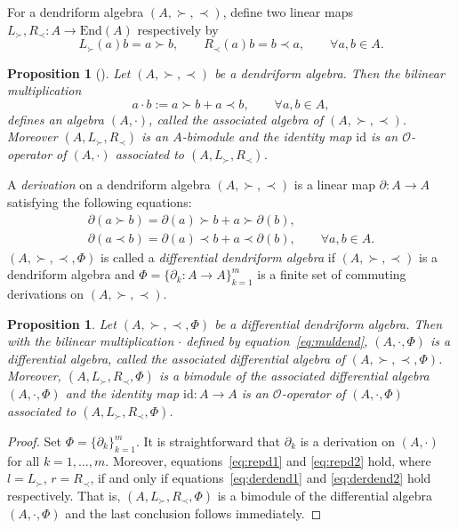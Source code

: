 \documentclass[10pt,a4paper]{amsart}
\numberwithin{equation}{section}
\newtheorem{Proposition}[Theorem]{Proposition}
{ \theoremstyle{definition}
	\newtheorem{Definition}[Theorem]{Definition}
	\newtheorem{Note}[Theorem]{Note}
	\newtheorem{Example}[Theorem]{Example}
	\newtheorem{Remark}[Theorem]{Remark} }
\newcommand{\id}{\mathrm{id}}
\newcommand{\End}{\mathrm{End}}
\begin{document}
For a dendriform algebra $(A, \succ, \prec)$, define two linear
maps $L_\succ, R_\prec\colon A \to \End(A)$ respectively by
\begin{equation*}
	L_\succ (a)b = a \succ b, \qquad R_\prec(a)b = b\prec a,\qquad \forall a, b\in A.
\end{equation*}

\begin{Proposition}[\cite{BaiDouble,Loday2001Dialgebras}]
 Let $(A, \succ, \prec)$ be a dendriform algebra.
 Then the bilinear multiplication
 \begin{equation}
 a \cdot b := a \succ b + a \prec b, \qquad \forall a, b \in A, \label{eq:muldend}
 \end{equation}
 defines an algebra $(A, \cdot)$, called the \textit{associated algebra} of $(A, \succ, \prec)$.
 Moreover $(A, L_\succ, R_\prec)$ is an $A$-bimodule and
 the identity map $\id$ is an $\mathcal{O}$-operator of $(A, \cdot)$ associated to $(A, L_\succ, R_\prec)$.
\end{Proposition}


\begin{Definition}
	A \textit{derivation} on a dendriform algebra $(A, \succ, \prec)$ is a linear map $\partial\colon A\rightarrow A$ satisfying the following equations:
 \begin{gather}
 \partial(a \succ b) = \partial(a) \succ b + a \succ \partial(b), \label{eq:derdend1} \\
 \partial(a \prec b) = \partial(a) \prec b + a \prec \partial(b), \qquad \forall a, b \in A. \label{eq:derdend2}
 \end{gather}
 $(A, \succ, \prec, \Phi)$ is called a \textit{differential dendriform algebra} if
 $(A, \succ, \prec)$ is a dendriform algebra and $\Phi = \{\partial_k\colon A \to A\}_{k=1}^m$ is a finite set of commuting derivations on $(A, \succ, \prec)$.
\end{Definition}

\begin{Proposition}\label{pro:assda}
 Let $(A, \succ, \prec, \Phi)$ be a differential dendriform algebra.
 Then with the bilinear multiplication $\cdot$ defined by equation~\eqref{eq:muldend},
 $(A, \cdot, \Phi)$ is a differential algebra,
 called the \textit{associated differential algebra of $(A, \succ, \prec, \Phi)$}.
 Moreover, $(A, L_\succ, R_\prec, \Phi)$ is a bimodule of the associated differential algebra $(A, \cdot, \Phi)$
 and the identity map $\id\colon A \to A$ is an $\mathcal{O}$-operator of $(A, \cdot, \Phi)$ associated to $(A, L_\succ, R_\prec, \Phi)$.
\end{Proposition}
\begin{proof}
	Set $\Phi = \{\partial_k\}_{k=1}^m$.
 It is straightforward that $\partial_k$ is a derivation on $(A, \cdot)$ for all $k=1, \dots, m$.
 Moreover, equations~\eqref{eq:repd1} and \eqref{eq:repd2} hold,
 where $l = L_\succ$, $r = R_\prec$,
 if and only if equations~\eqref{eq:derdend1} and \eqref{eq:derdend2} hold respectively.
 That is, $(A, L_\succ, R_\prec, \Phi)$ is a bimodule of the differential algebra $(A, \cdot, \Phi)$
 and the last conclusion follows immediately.
\end{proof}
\end{document}
